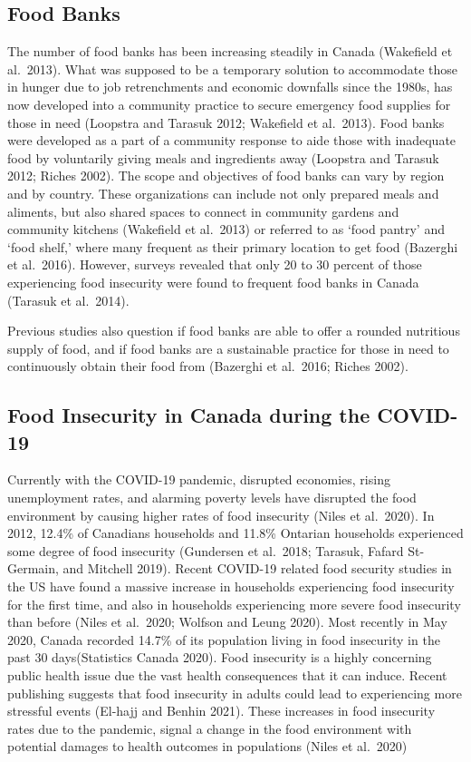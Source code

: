 \documentclass[]{elsarticle} %
\begin{document}
\hypertarget{food-banks}{%
\subsection{Food Banks}\label{food-banks}}

The number of food banks has been increasing steadily in Canada
(Wakefield et al.~2013). What was supposed to be a temporary solution to
accommodate those in hunger due to job retrenchments and economic
downfalls since the 1980s, has now developed into a community practice
to secure emergency food supplies for those in need (Loopstra and
Tarasuk 2012; Wakefield et al.~2013). Food banks were developed as a
part of a community response to aide those with inadequate food by
voluntarily giving meals and ingredients away (Loopstra and Tarasuk
2012; Riches 2002). The scope and objectives of food banks can vary by
region and by country. These organizations can include not only prepared
meals and aliments, but also shared spaces to connect in community
gardens and community kitchens (Wakefield et al.~2013) or referred to as
`food pantry' and `food shelf,' where many frequent as their primary
location to get food (Bazerghi et al.~2016). However, surveys revealed
that only 20 to 30 percent of those experiencing food insecurity were
found to frequent food banks in Canada (Tarasuk et al.~2014).

Previous studies also question if food banks are able to offer a rounded
nutritious supply of food, and if food banks are a sustainable practice
for those in need to continuously obtain their food from (Bazerghi et
al.~2016; Riches 2002).

\hypertarget{food-insecurity-in-canada-during-the-covid-19}{%
\subsection{Food Insecurity in Canada during the
COVID-19}\label{food-insecurity-in-canada-during-the-covid-19}}

Currently with the COVID-19 pandemic, disrupted economies, rising
unemployment rates, and alarming poverty levels have disrupted the food
environment by causing higher rates of food insecurity (Niles et
al.~2020). In 2012, 12.4\% of Canadians households and 11.8\% Ontarian
households experienced some degree of food insecurity (Gundersen et
al.~2018; Tarasuk, Fafard St-Germain, and Mitchell 2019). Recent
COVID-19 related food security studies in the US have found a massive
increase in households experiencing food insecurity for the first time,
and also in households experiencing more severe food insecurity than
before (Niles et al.~2020; Wolfson and Leung 2020). Most recently in May
2020, Canada recorded 14.7\% of its population living in food insecurity
in the past 30 days(Statistics Canada 2020). Food insecurity is a highly
concerning public health issue due the vast health consequences that it
can induce. Recent publishing suggests that food insecurity in adults
could lead to experiencing more stressful events (El-hajj and Benhin
2021). These increases in food insecurity rates due to the pandemic,
signal a change in the food environment with potential damages to health
outcomes in populations (Niles et al.~2020)
\end{document}

